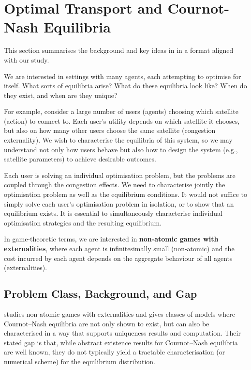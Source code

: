 \section{Optimal Transport and Cournot-Nash Equilibria}
This section summarises the background and key ideas in \cite{blanchet2016optimal} in a format aligned with our study.

We are interested in settings with many agents, each attempting to optimise for itself. What sorts of equilibria arise?
What do these equilibria look like? When do they exist, and when are they unique?

For example, consider a large number of users (agents) choosing which satellite (action) to connect to. 
Each user's utility depends on which satellite it chooses, but also on how many other users choose the 
same satellite (congestion externality). We wish to characterise the equilibria of this system, so we may 
understand not only how users behave but also how to design the system (e.g., satellite parameters) to 
achieve desirable outcomes.

Each user is solving an individual optimisation problem, but the problems are coupled through the congestion effects.
We need to characterise jointly the optimisation problem as well as the equilibrium conditions. It would not suffice 
to simply solve each user's optimisation problem in isolation, or to show that an equilibrium exists. It is essential 
to simultaneously characterise individual optimisation strategies and the resulting equilibrium.

In game-theoretic terms, we are interested in \textbf{non-atomic games with externalities}, where each agent is infinitesimally
small (non-atomic) and the cost incurred by each agent depends on the aggregate behaviour of all agents (externalities).

\subsection{Problem Class, Background, and Gap}

\cite{blanchet2016optimal} studies non-atomic games with externalities and gives classes of models where Cournot--Nash
equilibria are not only shown to exist, but can also be characterised in a way that supports uniqueness results and
computation. Their stated gap is that, while abstract existence results for Cournot--Nash equilibria are well known, they
do not typically yield a tractable characterisation (or numerical scheme) for the equilibrium distribution.

